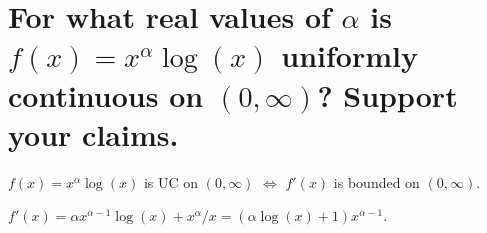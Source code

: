 \section{For what real values of $\alpha$ is 
    $f(x) = x^\alpha \log(x)$ uniformly continuous on $(0,\infty)$?
    Support your claims.}

    $f(x) = x^\alpha \log(x)$ is UC on $(0,\infty)$
    $\iff$ 
    $f'(x)$ is bounded on $(0,\infty)$.

    $f'(x) = \alpha x^{\alpha - 1} \log(x) + x^{\alpha} / x
        = (\alpha \log(x) + 1) x^{\alpha - 1}$.


